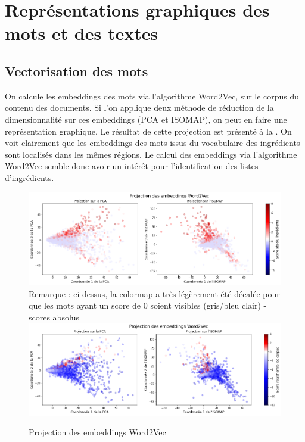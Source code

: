         \section{Représentations graphiques des mots et des textes}

            \subsection{Vectorisation des mots}

            On calcule les embeddings des mots via l'algorithme Word2Vec, sur le corpus du contenu des documents.
            Si l'on applique deux méthode de réduction de la dimensionnalité sur ces embeddings (PCA et ISOMAP), on peut en faire une représentation graphique.
            Le résultat de cette projection est présenté à la .
            On voit clairement que les embeddings des mots issus du vocabulaire des ingrédients sont localisés dans les mêmes régions.
            Le calcul des embeddings via l'algorithme Word2Vec semble donc avoir un intérêt pour l'identification des listes d'ingrédients. 

            \begin{figure}[htbp]
                \begin{center}
                \includegraphics[width=0.9\linewidth]{img/word2vec_projection.png}
                Remarque : ci-dessus, la colormap a très légèrement été décalée pour que les mots ayant un score de 0 soient visibles (gris/bleu clair) - scores absolus
                \bigskip
                \includegraphics[width=0.9\linewidth]{img/word2vec_projection_relative.png}
                \end{center}
                \caption{Projection des embeddings Word2Vec}
                \label{fig:word2vec_projection}
            \end{figure}            

